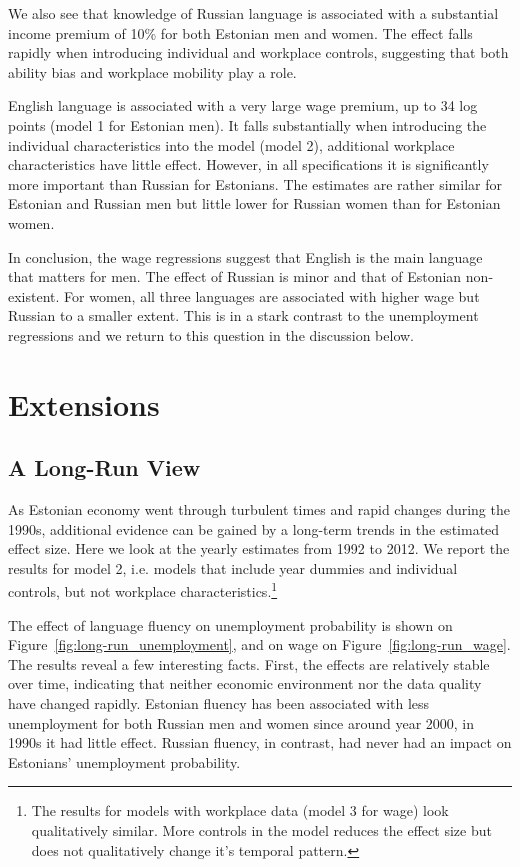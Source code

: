 \documentclass[12pt, a4paper]{article}
\begin{document}
We also see that knowledge of Russian language is associated with a
substantial income premium of 10\% for both Estonian men and women.
The effect falls rapidly when introducing
individual and workplace controls, suggesting that both ability bias
and workplace mobility play a role.

English language is associated with a very large
wage premium, up to 34 log points (model 1 for
Estonian men). It falls substantially when introducing the
individual characteristics into the model (model 2), additional
workplace characteristics have little effect.  However, in all
specifications it is
significantly more
important than Russian for Estonians. The estimates are rather
similar for Estonian and Russian men but little lower for Russian
women than for Estonian women.

In conclusion, the wage regressions suggest that English is the main
language that matters for men.  The effect of Russian is minor and
that of Estonian non-existent.  For women, all three languages are
associated with higher wage but Russian to a smaller extent.
This is in a stark contrast to the unemployment regressions and we return to
this question in the discussion below.


\section{Extensions}
\label{sec:extensions}

\subsection{A Long-Run View}
\label{sec:long-run}

As Estonian economy went through turbulent times and rapid changes
during the 1990s, additional evidence can be gained by a long-term
trends in the estimated effect size.  Here we look at the yearly estimates from 1992 to 2012.
We report the results for model 2, i.e. models that include year
dummies and individual controls, but not workplace
characteristics.\footnote{The results for models with workplace data (model
  3 for wage)
  look qualitatively similar.  More controls in the model reduces the effect size but does not qualitatively
  change it's temporal pattern.}

The effect of language fluency on unemployment probability is shown on
Figure~\ref{fig:long-run_unemployment}, and on wage on
Figure~\ref{fig:long-run_wage}.
The results reveal a few interesting facts.  First, the effects are
relatively stable over time, indicating that neither economic
environment nor the data quality have changed rapidly.  Estonian
fluency has been associated with less unemployment for both Russian men and
women since around year 2000, in 1990s it had little effect.  Russian fluency,
in contrast, had never had an impact on Estonians' unemployment probability.
\end{document}
